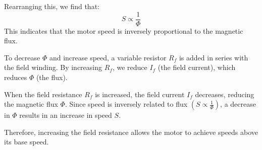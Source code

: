 \documentclass[a4paper,12pt]{article}
\begin{document}
	Rearranging this, we find that:
	\[
	S \propto \frac{1}{\Phi}
	\]
	This indicates that the motor speed is inversely proportional to the magnetic flux.
	
	To decrease \( \Phi \) and increase speed, a variable resistor \( R_f \) is added in series with the field winding. By increasing \( R_f \), we reduce \( I_f \) (the field current), which reduces \( \Phi \) (the flux).
	
	When the field resistance \( R_f \) is increased, the field current \( I_f \) decreases, reducing the magnetic flux \( \Phi \). Since speed is inversely related to flux \( \left( S \propto \frac{1}{\Phi} \right) \), a decrease in \( \Phi \) results in an increase in speed \( S \).
	
	Therefore, increasing the field resistance allows the motor to achieve speeds above its base speed.
\end{document}
